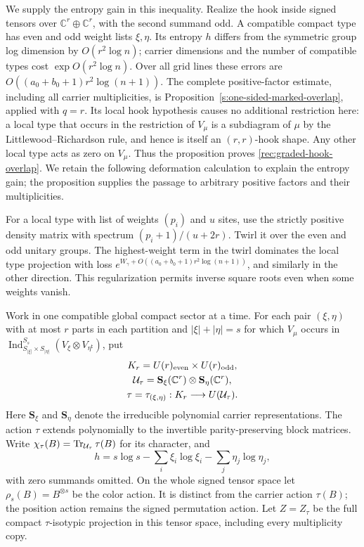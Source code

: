 We supply the entropy gain in this inequality.  Realize the hook
inside signed tensors over $\mathbb C^r\oplus\mathbb C^r$, with the
second summand odd.  A compatible compact type has even and odd
weight lists $\xi,\eta$.  Its entropy $h$ differs from the symmetric
group log dimension by $O(r^2\log n)$; carrier dimensions and the
number of compatible types cost $\exp O(r^2\log n)$.  Over all grid
lines these errors are $O((a_0+b_0+1)r^2\log(n+1))$. The complete
positive-factor estimate, including all carrier multiplicities, is
Proposition~\ref{s:one-sided-marked-overlap}, applied with $q=r$.
Its local hook hypothesis causes no additional restriction here:
a local type that occurs in the restriction of $V_\mu$ is a
subdiagram of $\mu$ by the Littlewood--Richardson rule, and hence
is itself an $(r,r)$-hook shape. Any other local type acts as zero
on $V_\mu$. Thus the proposition proves
\eqref{rec:graded-hook-overlap}. We retain the following deformation
calculation to explain the entropy gain; the proposition supplies
the passage to arbitrary positive factors and their multiplicities.

For a local type with list of weights $(p_i)$ and $u$ sites, use the
strictly positive density matrix with spectrum
$(p_i+1)/(u+2r)$.  Twirl it over the even and odd unitary groups.
The highest-weight term in the twirl dominates the local type
projection with loss $e^{W_\gamma+O((a_0+b_0+1)r^2\log(n+1))}$, and similarly in the
other direction.  This regularization permits inverse square roots
even when some weights vanish.

Work in one compatible global compact sector at a time.  For each
pair $(\xi,\eta)$ with at most $r$ parts in each partition and
$|\xi|+|\eta|=s$ for which $V_\mu$ occurs in
$\operatorname{Ind}_{S_{|\xi|}\times S_{|\eta|}}^{S_s}
(V_\xi\otimes V_{\eta^{\mathsf t}})$, put
\[
 \begin{gathered}
 K_r=U(r)_{\rm even}\times U(r)_{\rm odd},\\
 \mathcal U_\tau=
 \mathbf S_\xi(\mathbb C^r)\otimes\mathbf S_\eta(\mathbb C^r),\\
 \tau=\tau_{(\xi,\eta)}:K_r\longrightarrow U(\mathcal U_\tau).
 \end{gathered}
\]
Here $\mathbf S_\xi$ and $\mathbf S_\eta$ denote the irreducible
polynomial carrier representations.  The action $\tau$ extends
polynomially to the invertible parity-preserving block matrices.
Write $\chi_\tau(B)=\operatorname{Tr}_{\mathcal U_\tau}\tau(B)$ for its character,
and
\[
 h=s\log s-\sum_i\xi_i\log\xi_i-\sum_j\eta_j\log\eta_j,
\]
with zero summands omitted.  On the whole signed tensor space let
$\rho_s(B)=B^{\otimes s}$ be the color action.  It is distinct from
the carrier action $\tau(B)$; the position action remains the signed
permutation action.  Let $Z=Z_\tau$ be the full compact
$\tau$-isotypic projection in this tensor space, including every
multiplicity copy.

